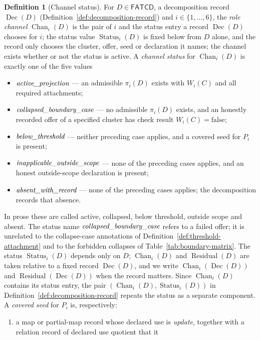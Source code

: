 \documentclass[11pt]{article}
\theoremstyle{definition}
\newtheorem{definition}[theorem]{Definition}
\newcommand{\FATCD}{\ensuremath{\mathsf{FATCD}}}
\newcommand{\Dec}[1]{\ensuremath{\operatorname{Dec}\!\left(#1\right)}}
\newcommand{\Residual}[1]{\ensuremath{\operatorname{Residual}\!\left(#1\right)}}
\newcommand{\Chan}[2]{\ensuremath{\operatorname{Chan}_{#1}\!\left(#2\right)}}
\newcommand{\Status}[2]{\ensuremath{\operatorname{Status}_{#1}\!\left(#2\right)}}
\newcommand{\activeproj}{\textit{active\_\allowbreak projection}}
\newcommand{\belowthr}{\textit{below\_\allowbreak threshold}}
\newcommand{\collapsedbc}{\textit{collapsed\_\allowbreak boundary\_\allowbreak case}}
\newcommand{\absentrec}{\textit{absent\_\allowbreak with\_\allowbreak record}}
\newcommand{\outsidescope}{\textit{inapplicable\_\allowbreak outside\_\allowbreak scope}}
\begin{document}
\begin{definition}[Channel status]\label{def:channel-status}
For \(D\in\FATCD{}\), a decomposition record \(\Dec{D}\)
(Definition~\ref{def:decomposition-record}) and \(i \in \{1,\ldots,6\}\), the
\emph{role channel} \(\Chan{i}{D}\) is the pair of \(i\) and the status entry a
record \(\Dec{D}\) chooses for \(i\); the status value \(\Status{i}{D}\) is fixed
below from \(D\) alone, and the record only chooses the cluster, offer, seed or
declaration it names; the channel exists whether or not the status is
active. A \emph{channel status} for
\(\Chan{i}{D}\) is exactly one of the five values
\begin{itemize}[topsep=2pt,itemsep=1pt]
  \item \(\activeproj\) --- an admissible \(\pi_i(D)\) exists with \(W_i(C)\)
    and all required attachments;
  \item \(\collapsedbc\) --- no admissible \(\pi_i(D)\) exists, and an
    honestly recorded offer of a specified cluster has check result
    \(W_i(C)=\mathrm{false}\);
  \item \(\belowthr\) --- neither preceding case applies, and a covered seed for
    \(P_i\) is present;
  \item \(\outsidescope\) --- none of the preceding cases applies, and an
    honest outside-scope declaration is present;
  \item \(\absentrec\) --- none of the preceding cases applies; the
    decomposition records that absence.
\end{itemize}
In prose these are called active, collapsed, below threshold, outside scope and absent. The status name \(\collapsedbc\) refers to a failed offer; it is unrelated to
the collapse-case annotations of Definition~\ref{def:threshold-attachment} and
to the forbidden collapses of Table~\ref{tab:boundary-matrix}.
The status \(\Status{i}{D}\) depends only on \(D\); \(\Chan{i}{D}\) and
\(\Residual{D}\) are taken relative to a fixed record \(\Dec{D}\), and we write
\(\Chan{i}{\Dec{D}}\) and \(\Residual{\Dec{D}}\) when the record matters. Since
\(\Chan{i}{D}\) contains its status entry, the pair
\((\Chan{i}{D},\Status{i}{D})\) in Definition~\ref{def:decomposition-record}
repeats the status as a separate component. A \emph{covered seed} for \(P_i\) is, respectively:
\begin{enumerate}[label=(\arabic*),topsep=2pt,itemsep=1pt]
  \item a map or partial-map record whose
declared use is \emph{update}, together with a relation record of declared use quotient that it

\end{enumerate}
\end{definition}
\end{document}
